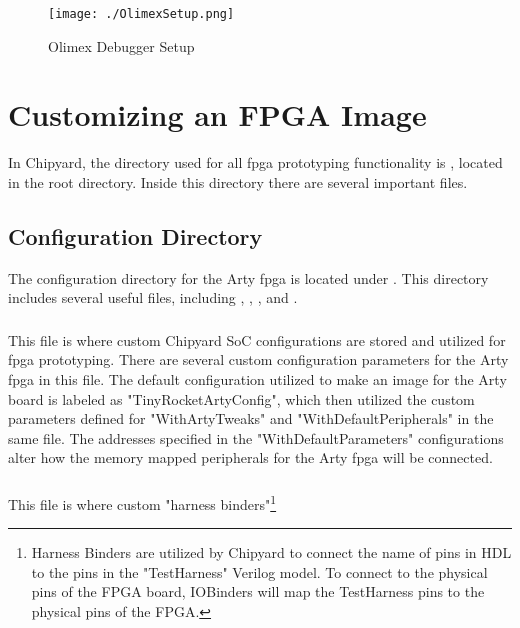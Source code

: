 \begin{figure}[h!tbp]
  \centering
  \texttt{[image: ./OlimexSetup.png]}
  \caption{Olimex Debugger Setup~\cite[p.~5]{FreedomDevGuide}}
  \label{fig:olimexsetup}
\end{figure}

\section{Customizing an FPGA Image}\label{sec:Customizing}
In Chipyard, the directory used for all \Gls{fpga} prototyping functionality is , located in the root directory.
Inside this directory there are several important files.


\subsection{Configuration Directory}\label{sec:Customizing_FPGA-Config_Directory}
The configuration directory for the Arty \Gls{fpga} is located under .
This directory includes several useful files, including , , , and .

\subsubsection{}\label{sec:Customizing_FPGA-Configs.scala}
This file is where custom Chipyard SoC configurations are stored and utilized for \Gls{fpga} prototyping.
There are several custom configuration parameters for the Arty \Gls{fpga} in this file.
The default configuration utilized to make an image for the Arty board is labeled as "TinyRocketArtyConfig", which then utilized the custom parameters defined for "WithArtyTweaks" and "WithDefaultPeripherals" in the same file.
The addresses specified in the "WithDefaultParameters" configurations alter how the memory mapped peripherals for the Arty \Gls{fpga} will be connected.

\subsubsection{}\label{sec:Customizing_FPGA-HarnessBinders.scala}
This file is where custom "harness binders"\footnote{Harness Binders are utilized by Chipyard to connect the name of pins in HDL to the pins in the "TestHarness" Verilog model. To connect to the physical pins of the FPGA board, IOBinders will map the TestHarness pins to the physical pins of the FPGA.}

